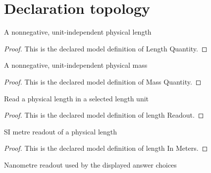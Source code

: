 \section{Declaration topology}
\begin{definition}
  \label{def:physics:phyx-mini-0656:phyxminiproblems-problemphyxmini0656-lengthquantity}
  A nonnegative, unit-independent physical length
\end{definition}
\begin{proof}
  This is the declared model definition of Length Quantity.
\end{proof}
\begin{definition}
  \label{def:physics:phyx-mini-0656:phyxminiproblems-problemphyxmini0656-massquantity}
  A nonnegative, unit-independent physical mass
\end{definition}
\begin{proof}
  This is the declared model definition of Mass Quantity.
\end{proof}
\begin{definition}
  \label{def:physics:phyx-mini-0656:phyxminiproblems-problemphyxmini0656-lengthreadout}
  Read a physical length in a selected length unit
\end{definition}
\begin{proof}
  This is the declared model definition of length Readout.
\end{proof}
\begin{definition}
  \label{def:physics:phyx-mini-0656:phyxminiproblems-problemphyxmini0656-lengthinmeters}
  SI metre readout of a physical length
\end{definition}
\begin{proof}
  This is the declared model definition of length In Meters.
\end{proof}
\begin{definition}
  \label{def:physics:phyx-mini-0656:phyxminiproblems-problemphyxmini0656-lengthinnanometers}
  Nanometre readout used by the displayed answer choices
\end{definition}

